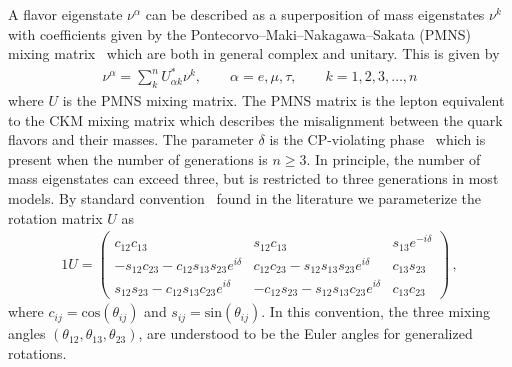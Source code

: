 \documentclass[universe,article,submit,moreauthors,pdftex,a4paper]{Definitions/mdpi}
\begin{document}
A flavor eigenstate $\nu^{\alpha}$ can be described as a superposition of mass eigenstates $\nu^{k}$ with coefficients given by the Pontecorvo–Maki–Nakagawa–Sakata (PMNS) mixing matrix~\cite{King:2013eh,FernandezMartinez:2016lgt} which are both in general  complex and unitary. This is given by
\begin{align}\label{NuFlavors}
	\nu^{\alpha}=\sum_k^nU^\ast_{\alpha k}\nu^{k}, \qquad\alpha=e,\mu,\tau,\qquad k=1,2,3,\dots,n
\end{align}
where $U$ is the PMNS mixing matrix. The PMNS matrix is the lepton equivalent to the CKM mixing matrix which describes the misalignment between the quark flavors and their masses. The parameter $\delta$ is the CP-violating phase~\cite{Pascoli:2006ci} which is present when the number of generations is $n\geq3$. In principle, the number of mass eigenstates can exceed three, but is restricted to three generations in most models. By standard convention~\cite{schwartz2014quantum} found in the literature we parameterize the rotation matrix $U$ as
	\begin{alignat}{1}
 	\label{PMNS} U =
		\begin{pmatrix}
			c_{12}c_{13} & s_{12}c_{13} & s_{13}e^{-i\delta}\\
			-s_{12}c_{23} - c_{12}s_{13}s_{23}e^{i\delta} & c_{12}c_{23} - s_{12}s_{13}s_{23}e^{i\delta} & c_{13}s_{23}\\
			s_{12}s_{23} - c_{12}s_{13}c_{23}e^{i\delta}& -c_{12}s_{23} - s_{12}s_{13}c_{23}e^{i\delta} & c_{13}c_{23}
		\end{pmatrix}\,,
	\end{alignat}
where $c_{ij} = \mathrm{cos}(\theta_{ij})$ and $s_{ij} = \mathrm{sin}(\theta_{ij})$. In this convention, the three mixing angles $(\theta_{12}, \theta_{13}, \theta_{23})$, are understood to be the Euler angles for generalized rotations.
\end{document}
